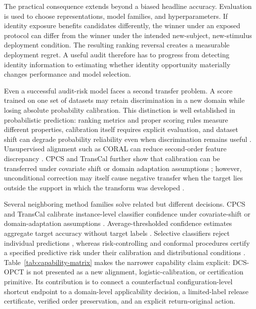\documentclass[preprint,12pt]{elsarticle}
\begin{document}
The practical consequence extends beyond a biased headline accuracy. Evaluation is used to choose representations, model families, and hyperparameters. If identity exposure benefits candidates differently, the winner under an exposed protocol can differ from the winner under the intended new-subject, new-stimulus deployment condition. The resulting ranking reversal creates a measurable deployment regret. A useful audit therefore has to progress from detecting identity information to estimating whether identity opportunity materially changes performance and model selection.

Even a successful audit-risk model faces a second transfer problem. A score trained on one set of datasets may retain discrimination in a new domain while losing absolute probability calibration. This distinction is well established in probabilistic prediction: ranking metrics and proper scoring rules measure different properties, calibration itself requires explicit evaluation, and dataset shift can degrade probability reliability even when discrimination remains useful \cite{niculescu2005probabilities,guo2017calibration,vaicenavicius2019calibration,ovadia2019trust,minderer2021calibration}. Unsupervised alignment such as CORAL can reduce second-order feature discrepancy \cite{sun2016coral}. CPCS and TransCal further show that calibration can be transferred under covariate shift or domain adaptation assumptions \cite{park2020cpcs,wang2020transcal,pampari2020unsupervised}; however, unconditional correction may itself cause negative transfer when the target lies outside the support in which the transform was developed \cite{bendavid2010domains,ericsson2023better}.

Several neighboring method families solve related but different decisions. CPCS and TransCal calibrate instance-level classifier confidence under covariate-shift or domain-adaptation assumptions \cite{park2020cpcs,wang2020transcal}. Average-thresholded confidence estimates aggregate target accuracy without target labels \cite{garg2022atc}. Selective classifiers reject individual predictions \cite{geifman2019selectivenet}, whereas risk-controlling and conformal procedures certify a specified predictive risk under their calibration and distributional conditions \cite{bates2021risk,angelopoulos2024crc}. Table~\ref{tab:capability-matrix} makes the narrower capability claim explicit: DCS-OPCT is not presented as a new alignment, logistic-calibration, or certification primitive. Its contribution is to connect a counterfactual configuration-level shortcut endpoint to a domain-level applicability decision, a limited-label release certificate, verified order preservation, and an explicit return-original action.
\end{document}
